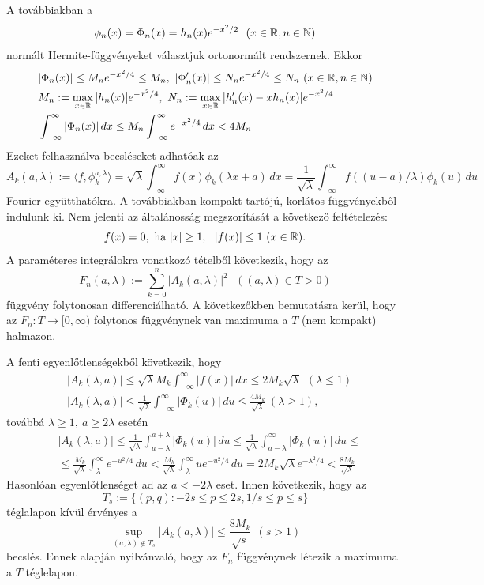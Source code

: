 \documentclass[oneside,titlepage,12pt,a4paper]{report}
\begin{document}
 A továbbiakban a
 $$
 \phi_n(x)=\Phi_n(x)=h_n(x)e^{-x^2/2}\ \ (x\in\Bbb R, n\in\Bbb N)
 $$
 normált Hermite-függvényeket választjuk ortonormált rendszernek. Ekkor
 \begin{equation}
 \begin{split}
 &|\Phi_n(x)|\le M_n e^{-x^2/4}\le M_n, \ |\Phi_n'(x)|\le N_n e^{-x^2/4}\le N_n\ (x\in\Bbb R, n\in\Bbb N)\\
 &M_n:=\max_{x\in\Bbb R}|h_n(x)|e^{-x^2/4},\ N_n:=\max_{x\in\Bbb R}|h'_n(x)-xh_n(x)|e^{-x^2/4}\\
 &\int_{-\infty}^\infty|\Phi_n(x)|\, dx\le M_n\int_{-\infty}^\infty e^{-x^2/4}\, dx<4M_n
 \end{split}
 \end{equation}
 Ezeket felhasználva becsléseket adhatóak az
 $$
 A_k(a,\lambda):=\langle f,\phi_k^{a,\lambda}\rangle=\sqrt{\lambda}\int_{-\infty}^\infty f(x)\phi_k(\lambda x+a)\, dx=\frac 1{\sqrt{\lambda}}\int_{-\infty}^\infty f((u-a)/\lambda)\phi_k(u)\, du
 $$
 Fourier-együtthatókra. A továbbiakban kompakt tartójú, korlátos függvényekből indulunk ki. Nem jelenti az általánosság megszorítását a következő feltételezés:
 $$
 f(x)=0,\ \text{ha}\ |x|\ge 1,\ \ |f(x)|\le 1 \ (x\in\Bbb R).
 $$
 A paraméteres integrálokra vonatkozó tételből  következik, hogy   az
 $$
 F_n(a,\lambda):=\sum_{k=0}^n|A_k(a,\lambda)|^2\ \ \  ((a,\lambda)\in T>0)
 $$
 függvény folytonosan  differenciálható. A következőkben bemutatásra kerül, hogy az $F_n:T\to [0,\infty)$
 folytonos függvénynek van maximuma a $T$ (nem kompakt) halmazon.

 A fenti egyenlőtlenségekből következik, hogy
 \begin{equation}
 \begin{split}
 &|A_k(\lambda,a)|\le \sqrt{\lambda} M_k\int_{-\infty}^\infty |f(x)|\, dx\le 2M_k\sqrt{\lambda}\ \ (\lambda\le 1)\\
 &|A_k(\lambda,a)|\le\frac 1{\sqrt{\lambda}}\int_{-\infty}^\infty |\Phi_k(u)|\, du\le
 \frac {4M_k}{\sqrt{\lambda}}\ (\lambda\ge 1),
 \end{split}
 \end{equation}
 továbbá $\lambda\ge 1,\ a\ge 2\lambda $ eset\'en
 \begin{equation}
 \begin{split}
 &|A_k(\lambda,a)|\le \frac 1{\sqrt{\lambda}}\int_{a-\lambda}^{a+\lambda}|\Phi_k(u)|\, du
 \le \frac 1{\sqrt{\lambda}}\int_{a-\lambda}^\infty |\Phi_k(u)|\, du\le\\
 &\le \frac {M_k}{\sqrt{\lambda}}\int_\lambda^\infty e^{-{u^2}/4}\, du<
 \frac {M_k}{\sqrt{\lambda}}\int_\lambda^\infty u e^{-{u^2}/4}\, du=
 2 M_k\sqrt{\lambda} e^{-{\lambda^2}/4}<\frac {8M_k}{\sqrt{\lambda}}
\end{split}
\end{equation}
Hasonlóan egyenlőtlenséget ad az $a<-2\lambda$ eset. Innen következik, hogy az
$$
T_s:=\{(p,q): -2s\le p\le 2s, 1/s\leq p \le s\}
$$
téglalapon kívül  érvényes a
$$
\sup_{(a,\lambda) \notin T_s}|A_k(a,\lambda)|\le \frac {8M_k}{\sqrt s}\ \  (s>1)
$$
becslés. Ennek alapján nyilvánvaló, hogy az $F_n$  függvénynek létezik a maximuma a $T$ téglelapon.
\end{document}
